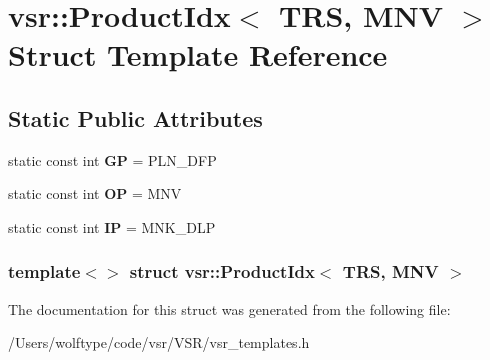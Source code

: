 \hypertarget{structvsr_1_1_product_idx_3_01_t_r_s_00_01_m_n_v_01_4}{\section{vsr\-:\-:Product\-Idx$<$ T\-R\-S, M\-N\-V $>$ Struct Template Reference}
\label{structvsr_1_1_product_idx_3_01_t_r_s_00_01_m_n_v_01_4}
}
\subsection*{Static Public Attributes}
\begin{DoxyCompactItemize}
\item 
\hypertarget{structvsr_1_1_product_idx_3_01_t_r_s_00_01_m_n_v_01_4_a5e06efd88cd60f3a0cd77e138573a5b1}{static const int {\bfseries G\-P} = P\-L\-N\-\_\-\-D\-F\-P}\label{structvsr_1_1_product_idx_3_01_t_r_s_00_01_m_n_v_01_4_a5e06efd88cd60f3a0cd77e138573a5b1}

\item 
\hypertarget{structvsr_1_1_product_idx_3_01_t_r_s_00_01_m_n_v_01_4_add164e030a13c01b9d910d6a2a9e8eb7}{static const int {\bfseries O\-P} = M\-N\-V}\label{structvsr_1_1_product_idx_3_01_t_r_s_00_01_m_n_v_01_4_add164e030a13c01b9d910d6a2a9e8eb7}

\item 
\hypertarget{structvsr_1_1_product_idx_3_01_t_r_s_00_01_m_n_v_01_4_a6d364f950ea254850e44786dcf7f6de1}{static const int {\bfseries I\-P} = M\-N\-K\-\_\-\-D\-L\-P}\label{structvsr_1_1_product_idx_3_01_t_r_s_00_01_m_n_v_01_4_a6d364f950ea254850e44786dcf7f6de1}

\end{DoxyCompactItemize}
\subsubsection*{template$<$$>$ struct vsr\-::\-Product\-Idx$<$ T\-R\-S, M\-N\-V $>$}



The documentation for this struct was generated from the following file\-:\begin{DoxyCompactItemize}
\item 
/\-Users/wolftype/code/vsr/\-V\-S\-R/vsr\-\_\-templates.\-h\end{DoxyCompactItemize}
